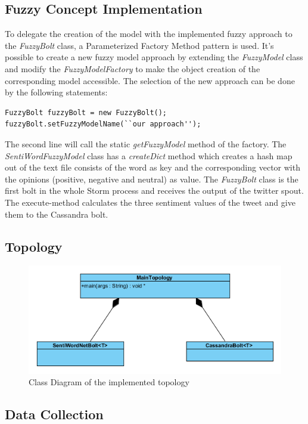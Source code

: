 \documentclass[a4paper]{article}
\begin{document}
\subsection{Fuzzy Concept Implementation}
To delegate the creation of the model with the implemented fuzzy approach to the \textit{FuzzyBolt} class, a Parameterized Factory Method pattern is used. It's possible to create a new fuzzy model approach by extending the \textit{FuzzyModel} class and modify the \textit{FuzzyModelFactory} to make the object creation of the corresponding model accessible. The selection of the new approach can be done by the following statements:
\lstset{language=Java}
\begin{lstlisting}
FuzzyBolt fuzzyBolt = new FuzzyBolt();
fuzzyBolt.setFuzzyModelName(``our approach'');
\end{lstlisting}
The second line will call the static \textit{getFuzzyModel} method of the factory.
The \textit{SentiWordFuzzyModel} class has a \textit{createDict} method which creates a hash map out of the text file consists of the word as key and the corresponding vector with the opinions (positive, negative and neutral) as value.
The \textit{FuzzyBolt} class is the first bolt in the whole Storm process and receives the output of the twitter spout. The execute-method calculates the three sentiment values of the tweet and give them to the Cassandra bolt.

\subsection{Topology}
\begin{figure}[h!]
	\centering
	\includegraphics[scale=2.5]{images/uml_topology.png}
	\caption{Class Diagram of the implemented topology}
	\label{uml_fuzzy}
\end{figure}
\subsection{Data Collection}
\end{document}
